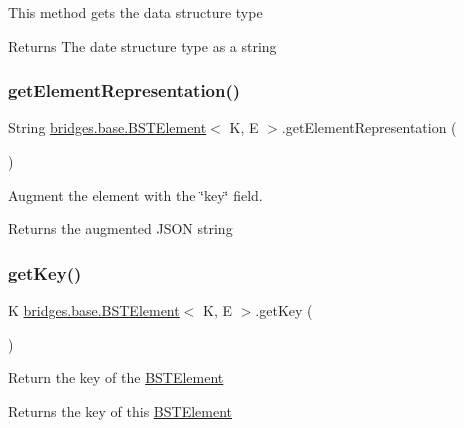 This method gets the data structure type

\begin{DoxyReturn}{Returns}
The date structure type as a string 
\end{DoxyReturn}
\mbox{\label{classbridges_1_1base_1_1_b_s_t_element_a0619c81bb38df6fc64a651a909f64d84}} 
\subsubsection{\texorpdfstring{getElementRepresentation()}{getElementRepresentation()}}
{\footnotesize\ttfamily String \mbox{\hyperlink{classbridges_1_1base_1_1_b_s_t_element}{bridges.\+base.\+B\+S\+T\+Element}}$<$ K, E $>$.get\+Element\+Representation (\begin{DoxyParamCaption}{ }\end{DoxyParamCaption})}

Augment the element with the \char`\"{}key\char`\"{} field.

\begin{DoxyReturn}{Returns}
the augmented J\+S\+ON string 
\end{DoxyReturn}
\mbox{\label{classbridges_1_1base_1_1_b_s_t_element_afba950fad36d3327b01003df3ba4cc9f}} 
\subsubsection{\texorpdfstring{getKey()}{getKey()}}
{\footnotesize\ttfamily K \mbox{\hyperlink{classbridges_1_1base_1_1_b_s_t_element}{bridges.\+base.\+B\+S\+T\+Element}}$<$ K, E $>$.get\+Key (\begin{DoxyParamCaption}{ }\end{DoxyParamCaption})}

Return the key of the \mbox{\hyperlink{classbridges_1_1base_1_1_b_s_t_element}{B\+S\+T\+Element}}

\begin{DoxyReturn}{Returns}
the key of this \mbox{\hyperlink{classbridges_1_1base_1_1_b_s_t_element}{B\+S\+T\+Element}} 
\end{DoxyReturn}
\mbox{\label{classbridges_1_1base_1_1_b_s_t_element_a8abdd6e4a0486de7fa45fbb233b56688}} 
